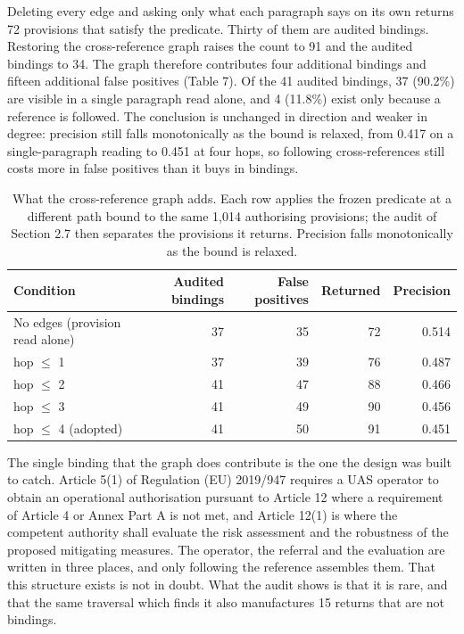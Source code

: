 Deleting every edge and asking only what each paragraph says on its own returns 72 provisions that satisfy the predicate. Thirty of them are audited bindings. Restoring the cross-reference graph raises the count to 91 and the audited bindings to 34. The graph therefore contributes four additional bindings and fifteen additional false positives (Table 7). Of the 41 audited bindings, 37 (90.2\%) are visible in a single paragraph read alone, and 4 (11.8\%) exist only because a reference is followed. The conclusion is unchanged in direction and weaker in degree: precision still falls monotonically as the bound is relaxed, from 0.417 on a single-paragraph reading to 0.451 at four hops, so following cross-references still costs more in false positives than it buys in bindings.

\begin{table}[!htb]
\centering
\caption{What the cross-reference graph adds. Each row applies the frozen predicate at a different path bound to the same 1,014 authorising provisions; the audit of Section 2.7 then separates the provisions it returns. Precision falls monotonically as the bound is relaxed.}
\label{tab:t7}
\small
\begin{tabular}{@{}lrrrr@{}}
\toprule
Condition & Audited bindings & False positives & Returned & Precision \\
\midrule
No edges (provision read alone) & 37 & 35 & 72 & 0.514 \\
hop $\le$ 1 & 37 & 39 & 76 & 0.487 \\
hop $\le$ 2 & 41 & 47 & 88 & 0.466 \\
hop $\le$ 3 & 41 & 49 & 90 & 0.456 \\
hop $\le$ 4 (adopted) & 41 & 50 & 91 & 0.451 \\
\bottomrule
\end{tabular}
\end{table}

The single binding that the graph does contribute is the one the design was built to catch. Article 5(1) of Regulation (EU) 2019/947 requires a UAS operator to obtain an operational authorisation pursuant to Article 12 where a requirement of Article 4 or Annex Part A is not met, and Article 12(1) is where the competent authority shall evaluate the risk assessment and the robustness of the proposed mitigating measures. The operator, the referral and the evaluation are written in three places, and only following the reference assembles them. That this structure exists is not in doubt. What the audit shows is that it is rare, and that the same traversal which finds it also manufactures 15 returns that are not bindings.

